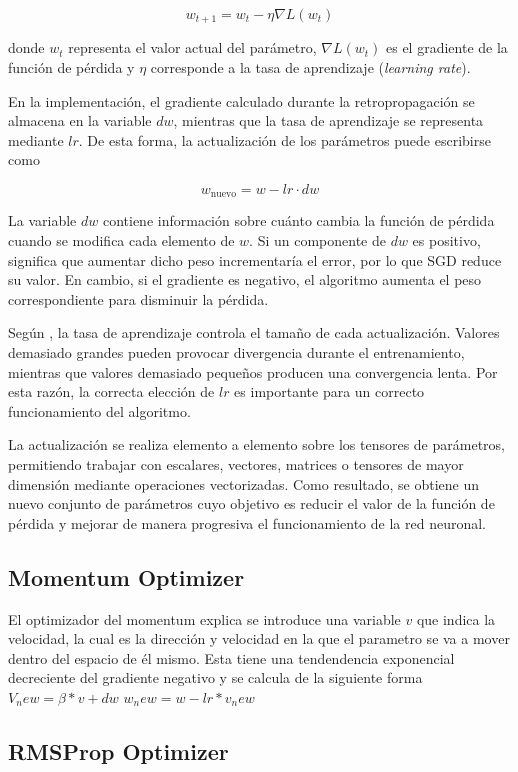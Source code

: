 \documentclass[12pt]{article}
\begin{document}
$$w_{t+1}=w_t-\eta \nabla L(w_t)$$

donde $w_t$ representa el valor actual del parámetro, $\nabla L(w_t)$ es el gradiente de la función de pérdida y $\eta$
corresponde a la tasa de aprendizaje (\textit{learning rate}).

En la implementación, el gradiente calculado durante la retropropagación se almacena en la variable $dw$, 
mientras que la tasa de aprendizaje se representa mediante $lr$. De esta forma, la actualización de los 
parámetros puede escribirse como

$$w_{\text{nuevo}} = w - lr \cdot dw$$

La variable $dw$ contiene información sobre cuánto cambia la función de pérdida cuando se modifica cada elemento de $w$. 
Si un componente de $dw$ es positivo, significa que aumentar dicho peso incrementaría el error, por lo que SGD reduce su 
valor. En cambio, si el gradiente es negativo, el algoritmo aumenta el peso correspondiente para disminuir la pérdida.

Según \textcite{Goodfellow2016}, la tasa de aprendizaje controla el tamaño de cada actualización. 
Valores demasiado grandes pueden provocar divergencia durante el entrenamiento, mientras 
que valores demasiado pequeños producen una convergencia lenta. Por esta razón, la correcta elección de $lr$ 
es importante para un correcto funcionamiento del algoritmo.

La actualización se realiza elemento a elemento sobre los tensores de parámetros, 
permitiendo trabajar con escalares, vectores, matrices o tensores de mayor dimensión mediante operaciones 
vectorizadas. Como resultado, se obtiene un nuevo conjunto de parámetros cuyo objetivo es reducir el valor de la 
función de pérdida y mejorar de manera progresiva el funcionamiento de la red neuronal.
\subsection{Momentum Optimizer}
 El optimizador del momentum explica \textcite{Goodfellow2016} se introduce una variable $v$ que indica la velocidad, 
 la cual es la dirección y velocidad en la que el parametro se va a mover dentro del espacio de él mismo. Esta tiene una tendendencia exponencial 
 decreciente del gradiente negativo y se calcula de la siguiente forma
 $
 V_new=\beta*v+dw
 $
 $
 w_new=w-lr*v_new
 $
\subsection{RMSProp Optimizer}
\end{document}

